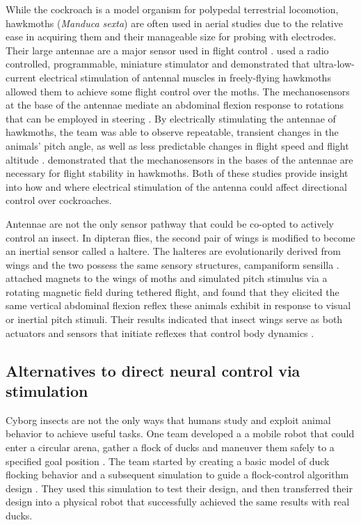 While the cockroach is a model organism for polypedal terrestrial locomotion, hawkmoths (\emph{Manduca sexta}) are often used in aerial studies due to the relative ease in acquiring them and their manageable size for probing with electrodes.  Their large antennae are a major sensor used in flight control \citep{antennal}.  \citet{wireless} used a radio controlled, programmable, miniature stimulator and demonstrated that ultra-low-current electrical stimulation of antennal muscles in freely-flying hawkmoths allowed them to achieve some flight control over the moths. The mechanosensors at the base of the antennae mediate an abdominal flexion response to rotations that can be employed in steering \citep{wireless}. By electrically stimulating the antennae of hawkmoths, the team was able to observe repeatable, transient changes in the animals’ pitch angle, as well as less predictable changes in flight speed and flight altitude \citep{wireless}. \citet{antennal} demonstrated that the mechanosensors in the bases of the antennae are necessary for flight stability in hawkmoths. Both of these studies provide insight into how and where electrical stimulation of the antenna could affect directional control over cockroaches.

Antennae are not the only sensor pathway that could be co-opted to actively control an insect. In dipteran flies, the second pair of wings is modified to become an inertial sensor called a haltere.  The halteres are evolutionarily derived from wings and the two possess the same sensory structures, campaniform sensilla \citep{Dickerson2014}. \citet{Dickerson2014} attached magnets to the wings of moths and simulated pitch stimulus via a rotating magnetic field during tethered flight, and found that they elicited the same vertical abdominal flexion reflex these animals exhibit in response to visual or inertial pitch stimuli. Their results indicated that insect wings serve as both actuators and sensors that initiate reflexes that control body dynamics \citep{Dickerson2014}.

\subsection{Alternatives to direct neural control via stimulation}
Cyborg insects are not the only ways that humans study and exploit animal behavior to achieve useful tasks. One team developed a a mobile robot that could enter a circular arena, gather a flock of ducks and maneuver them safely to a specified goal position \citep{robot}. The team started by creating a basic model of duck flocking behavior and a subsequent simulation to guide a flock-control algorithm design \citep{robot}. They used this simulation to test their design, and then transferred their design into a physical robot that successfully achieved the same results with real ducks\citep{robot}.

